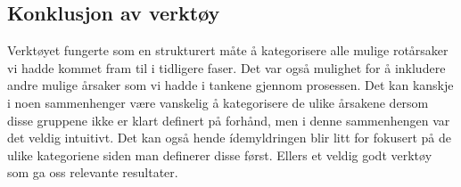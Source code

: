 \subsection{Konklusjon av verktøy}
Verktøyet fungerte som en strukturert måte å kategorisere alle mulige rotårsaker vi hadde kommet fram til i tidligere faser. Det var også mulighet for å inkludere andre mulige årsaker som vi hadde i tankene gjennom prosessen. Det kan kanskje i noen sammenhenger være vanskelig å kategorisere de ulike årsakene dersom disse gruppene ikke er klart definert på forhånd, men i denne sammenhengen var det veldig intuitivt. Det kan også hende ídemyldringen blir litt for fokusert på de ulike kategoriene siden man definerer disse først. Ellers et veldig godt verktøy som ga oss relevante resultater. 